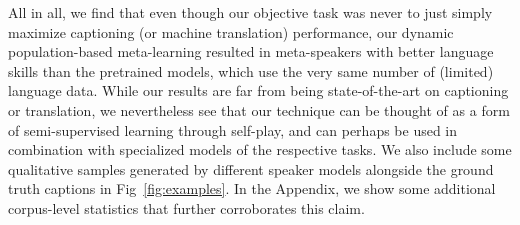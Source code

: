 \documentclass{article}
\begin{document}
All in all, we find that even though our objective task was never to just simply maximize captioning (or machine translation) performance, our dynamic population-based meta-learning resulted in meta-speakers with better language skills than the pretrained models, which use the very same number of (limited) language data. While our results are far from being state-of-the-art on captioning or translation,  we nevertheless see that our technique can be thought of as a form of semi-supervised learning through self-play, and can perhaps be used in combination with specialized models of the respective tasks. We also include some qualitative samples generated by different speaker models alongside the ground truth captions in Fig~\ref{fig:examples}. In the Appendix, we show some additional corpus-level statistics that further corroborates this claim.
\end{document}
